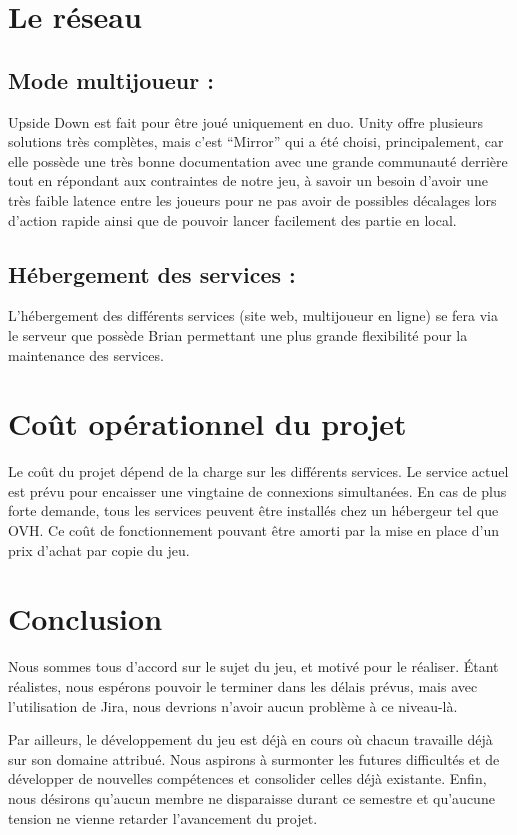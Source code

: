 \documentclass[a4paper,11pt]{article}
\begin{document}
\section{Le réseau}

\subsection{Mode multijoueur :} 
	
Upside Down est fait pour être joué uniquement en duo. Unity offre plusieurs solutions très complètes, 
mais c’est “Mirror” qui a été choisi, principalement, car elle possède une très bonne documentation avec une 
grande communauté derrière tout en répondant aux contraintes de notre jeu, à savoir un besoin d’avoir une 
très faible latence entre les joueurs pour ne pas avoir de possibles décalages lors d’action rapide ainsi 
que de pouvoir lancer facilement des partie en local.


\subsection{Hébergement des services :}
	
L'hébergement des différents services (site web, multijoueur en ligne) se fera via le serveur 
que possède Brian permettant une plus grande flexibilité pour la maintenance des services.



\section{Coût opérationnel du projet}

Le coût du projet dépend de la charge sur les différents services.
Le service actuel est prévu pour encaisser une vingtaine de connexions simultanées.
En cas de plus forte demande, tous les services peuvent être installés chez un hébergeur tel que OVH. 
Ce coût de fonctionnement pouvant être amorti par la mise en place d’un prix d’achat par copie du jeu.


\section{Conclusion}

Nous sommes tous d'accord sur le sujet du jeu, et motivé pour le réaliser. Étant réalistes, nous espérons pouvoir le terminer
dans les délais prévus, mais avec l'utilisation de Jira, nous devrions n'avoir aucun problème à ce niveau-là.\newline

Par ailleurs, le développement du jeu est déjà en cours où chacun travaille déjà sur son domaine attribué. Nous aspirons à surmonter les futures difficultés et de développer de nouvelles compétences et consolider celles déjà existante.
Enfin, nous désirons qu'aucun membre ne disparaisse durant ce semestre et qu'aucune tension ne vienne retarder l'avancement du projet.
\end{document}
